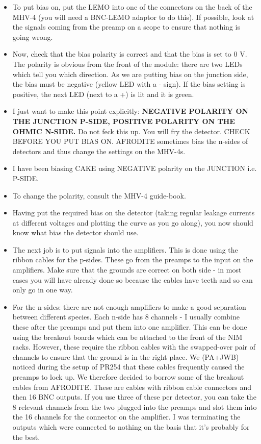 \documentclass[11pt]{report}
\begin{document}
\begin{itemize}
\item To put bias on, put the LEMO into one of the connectors on the back of the MHV-4 (you will need a BNC-LEMO adaptor to do this). If possible, look at the signals coming from the preamp on a scope to ensure that nothing is going wrong.

\item Now, check that the bias polarity is correct and that the bias is set to 0 V. The polarity is obvious from the front of the module: there are two LEDs which tell you which direction. As we are putting bias on the junction side, the bias must be negative (yellow LED with a - sign). If the bias setting is positive, the next LED (next to a +) is lit and it is green.

\item I just want to make this point explicitly: \textbf{NEGATIVE POLARITY ON THE JUNCTION P-SIDE, POSITIVE POLARITY ON THE OHMIC N-SIDE.} Do not feck this up. You will fry the detector. CHECK BEFORE YOU PUT BIAS ON. AFRODITE sometimes bias the n-sides of detectors and thus change the settings on the MHV-4s.

\item I have been biasing CAKE using NEGATIVE polarity on the JUNCTION i.e. P-SIDE.

\item To change the polarity, consult the MHV-4 guide-book.

\item Having put the required bias on the detector (taking regular leakage currents at different voltages and plotting the curve as you go along), you now should know what bias the detector should use.

\item The next job is to put signals into the amplifiers. This is done using the ribbon cables for the p-sides. These go from the preamps to the input on the amplifiers. Make sure that the grounds are correct on both side - in most cases you will have already done so because the cables have teeth and so can only go in one way.

\item For the n-sides: there are not enough amplifiers to make a good separation between different species. Each n-side has 8 channels - I usually combine these after the preamps and put them into one amplifier. This can be done using the breakout boards which can be attached to the front of the NIM racks. However, these require the ribbon cables with the swapped-over pair of channels to ensure that the ground is in the right place. We (PA+JWB) noticed during the setup of PR254 that these cables frequently caused the preamps to lock up. We therefore decided to borrow some of the breakout cables from AFRODITE. These are cables with ribbon cable connectors and then 16 BNC outputs. If you use three of these per detector, you can take the 8 relevant channels from the two plugged into the preamps and slot them into the 16 channels for the connector on the amplifier. I was terminating the outputs which were connected to nothing on the basis that it\textquoteright s probably for the best.


\end{itemize}
\end{document}
